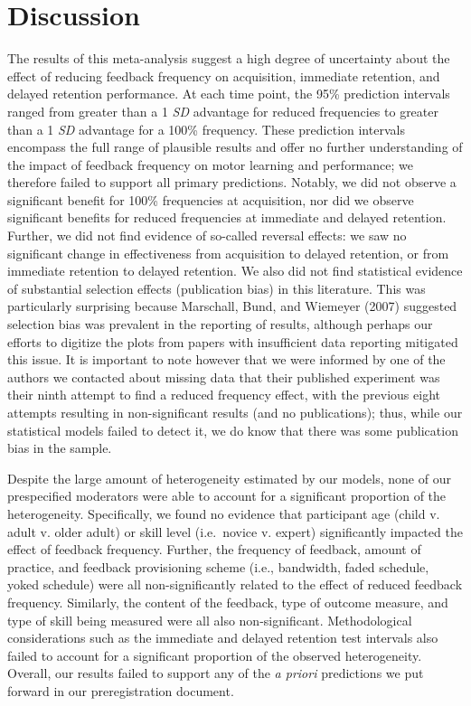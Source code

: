 \documentclass[
  english,
  man, donotrepeattitle,floatsintext]{apa7}
\begin{document}
\hypertarget{discussion}{%
\section{Discussion}\label{discussion}}

The results of this meta-analysis suggest a high degree of uncertainty about the effect of reducing feedback frequency on acquisition, immediate retention, and delayed retention performance. At each time point, the 95\% prediction intervals ranged from greater than a 1 \emph{SD} advantage for reduced frequencies to greater than a 1 \emph{SD} advantage for a 100\% frequency. These prediction intervals encompass the full range of plausible results and offer no further understanding of the impact of feedback frequency on motor learning and performance; we therefore failed to support all primary predictions. Notably, we did not observe a significant benefit for 100\% frequencies at acquisition, nor did we observe significant benefits for reduced frequencies at immediate and delayed retention. Further, we did not find evidence of so-called reversal effects: we saw no significant change in effectiveness from acquisition to delayed retention, or from immediate retention to delayed retention. We also did not find statistical evidence of substantial selection effects (publication bias) in this literature. This was particularly surprising because Marschall, Bund, and Wiemeyer (2007) suggested selection bias was prevalent in the reporting of results, although perhaps our efforts to digitize the plots from papers with insufficient data reporting mitigated this issue. It is important to note however that we were informed by one of the authors we contacted about missing data that their published experiment was their ninth attempt to find a reduced frequency effect, with the previous eight attempts resulting in non-significant results (and no publications); thus, while our statistical models failed to detect it, we do know that there was some publication bias in the sample.

Despite the large amount of heterogeneity estimated by our models, none of our prespecified moderators were able to account for a significant proportion of the heterogeneity. Specifically, we found no evidence that participant age (child v. adult v. older adult) or skill level (i.e.~novice v. expert) significantly impacted the effect of feedback frequency. Further, the frequency of feedback, amount of practice, and feedback provisioning scheme (i.e., bandwidth, faded schedule, yoked schedule) were all non-significantly related to the effect of reduced feedback frequency. Similarly, the content of the feedback, type of outcome measure, and type of skill being measured were all also non-significant. Methodological considerations such as the immediate and delayed retention test intervals also failed to account for a significant proportion of the observed heterogeneity. Overall, our results failed to support any of the \emph{a priori} predictions we put forward in our preregistration document.
\end{document}
